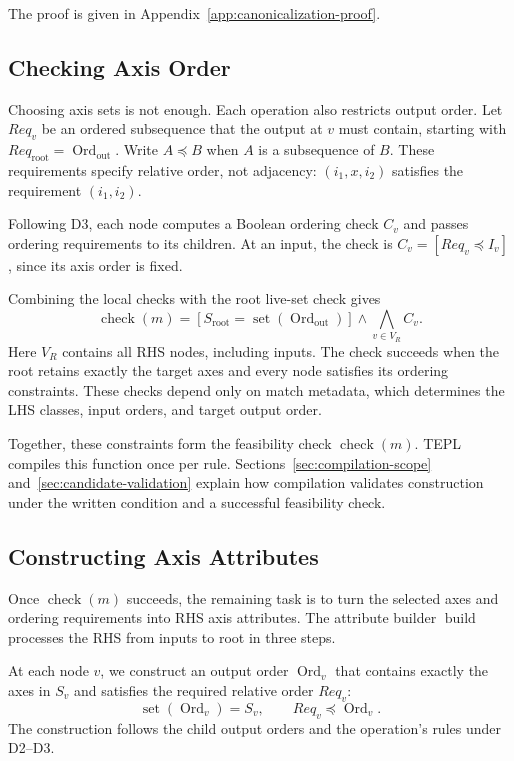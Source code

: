 The proof is given in Appendix~\ref{app:canonicalization-proof}.

\subsection{Checking Axis Order}
\label{sec:ordering-feasibility}
Choosing axis sets is not enough. Each operation also restricts output
order. Let $Req_v$ be an ordered subsequence that the output at $v$ must
contain, starting with $Req_{\mathrm{root}}=\operatorname{Ord}_{\mathrm{out}}$. Write $A\preceq B$ when
$A$ is a subsequence of $B$. These requirements specify relative order,
not adjacency: $(i_1,x,i_2)$ satisfies the requirement $(i_1,i_2)$.

Following D3, each node computes a Boolean ordering check $C_v$ and passes
ordering requirements to its children. At an input, the check is
$C_v=[Req_v\preceq I_v]$, since its axis order is fixed.

Combining the local checks with the root live-set check gives
\begin{equation}
 \operatorname{check}(m)
 =[S_{\mathrm{root}}=\operatorname{set}(\operatorname{Ord}_{\mathrm{out}})]
 \land\bigwedge_{v\in V_R}C_v.
\label{eq:feasibility}
\end{equation}
Here $V_R$ contains all RHS nodes, including inputs. The check succeeds
when the root retains exactly the target axes and every node satisfies
its ordering constraints.
These checks depend only on match metadata, which determines the LHS
classes, input orders, and target output order.

Together, these constraints form the feasibility check
$\operatorname{check}(m)$. TEPL compiles this function once per rule.
Sections~\ref{sec:compilation-scope} and~\ref{sec:candidate-validation}
explain how compilation validates construction under the written condition
and a successful feasibility check.

\subsection{Constructing Axis Attributes}
\label{sec:formal-construction}
Once $\operatorname{check}(m)$ succeeds, the remaining task is to turn
the selected axes and ordering requirements into RHS axis attributes.
The attribute builder $\operatorname{build}$ processes the RHS from inputs to root
in three steps.

At each node $v$, we construct an output order $\operatorname{Ord}_v$
that contains exactly the axes in $S_v$ and satisfies the required
relative order $Req_v$:
\begin{equation}
 \operatorname{set}(\operatorname{Ord}_v)=S_v,
 \qquad Req_v\preceq\operatorname{Ord}_v.
 \label{eq:order-invariant}
\end{equation}
The construction follows the child output orders and the operation's
rules under D2--D3. 

